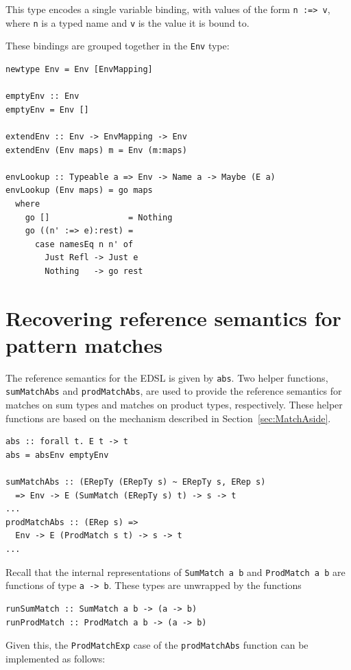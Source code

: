 \documentclass[runningheads, a4paper]{llncs}
\newcommand{\ttt}{\texttt}
\begin{document}
This type encodes a single variable binding, with values of the form
\ttt{n :=> v}, where \ttt{n} is a typed name and \ttt{v} is the value it is bound to.

These bindings are grouped together in the \ttt{Env} type:
\begin{lstlisting}
newtype Env = Env [EnvMapping]

emptyEnv :: Env
emptyEnv = Env []

extendEnv :: Env -> EnvMapping -> Env
extendEnv (Env maps) m = Env (m:maps)

envLookup :: Typeable a => Env -> Name a -> Maybe (E a)
envLookup (Env maps) = go maps
  where
    go []                = Nothing
    go ((n' :=> e):rest) =
      case namesEq n n' of
        Just Refl -> Just e
        Nothing   -> go rest
\end{lstlisting}


\section{Recovering reference semantics for pattern matches}
\label{sec:StdSemantics}

The reference semantics for the EDSL is given by \ttt{abs}. Two helper
functions, \ttt{sumMatchAbs} and \ttt{prodMatchAbs}, are used to provide
the reference semantics for matches on sum types and matches on product
types, respectively. These helper functions are based on the mechanism
described in Section~\ref{sec:MatchAside}.

\begin{lstlisting}
abs :: forall t. E t -> t
abs = absEnv emptyEnv

sumMatchAbs :: (ERepTy (ERepTy s) ~ ERepTy s, ERep s)
  => Env -> E (SumMatch (ERepTy s) t) -> s -> t
...
prodMatchAbs :: (ERep s) =>
  Env -> E (ProdMatch s t) -> s -> t
...
\end{lstlisting}

Recall that the internal representations of \verb|SumMatch a b| and \verb|ProdMatch a b|
are functions of type \verb|a -> b|. These types are unwrapped by the functions

\begin{lstlisting}
runSumMatch :: SumMatch a b -> (a -> b)
runProdMatch :: ProdMatch a b -> (a -> b)
\end{lstlisting}

Given this, the \verb|ProdMatchExp| case of the \verb|prodMatchAbs| function can be
implemented as follows:
\end{document}
